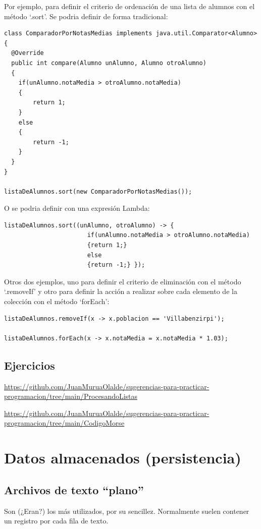 \documentclass[spanish,12pt,a4paper,final,oneside]{book}
\begin{document}
\begin{footnotesize}
Por ejemplo, para definir el criterio de ordenación de una lista de alumnos con el método `.sort'. Se podria definir de forma tradicional:
\begin{verbatim}
class ComparadorPorNotasMedias implements java.util.Comparator<Alumno>
{
  @Override
  public int compare(Alumno unAlumno, Alumno otroAlumno)
  {
    if(unAlumno.notaMedia > otroAlumno.notaMedia)
    {
        return 1;
    }
    else
    {
        return -1;
    }
  }
}

listaDeAlumnos.sort(new ComparadorPorNotasMedias());
\end{verbatim}
O se podria definir con una expresión Lambda:
\begin{verbatim}
listaDeAlumnos.sort((unAlumno, otroAlumno) -> { 
                       if(unAlumno.notaMedia > otroAlumno.notaMedia)
                       {return 1;}
                       else
                       {return -1;} });
\end{verbatim}

Otros dos ejemplos, uno para definir el criterio de eliminación con el método `.removeIf' y otro para definir la acción a realizar sobre cada elemento de la colección con el método `forEach':
\begin{verbatim}
listaDeAlumnos.removeIf(x -> x.poblacion == 'Villabenzirpi');

listaDeAlumnos.forEach(x -> x.notaMedia = x.notaMedia * 1.03);
\end{verbatim}

\end{footnotesize}


\section{Ejercicios}

\url{https://github.com/JuanMuruaOlalde/sugerencias-para-practicar-programacion/tree/main/ProcesandoListas}

\url{https://github.com/JuanMuruaOlalde/sugerencias-para-practicar-programacion/tree/main/CodigoMorse}




\chapter{Datos almacenados (persistencia)}

\section{Archivos de texto ``plano''}
Son (¿Eran?) los más utilizados, por su sencillez. Normalmente suelen contener un registro por cada fila de texto.
\end{document}
